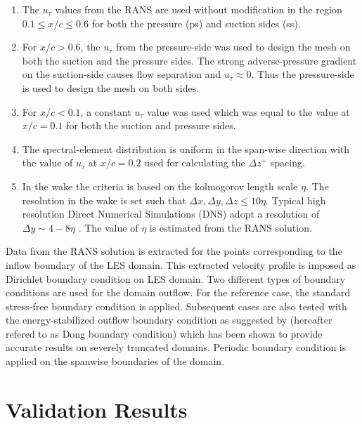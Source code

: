 \begin{enumerate}[topsep=5pt]
	\item The $u_{\tau}$ values from the RANS are used without modification in the region $0.1\le x/c\le0.6$ for both the pressure (ps) and suction sides (ss).
	\item For $x/c>0.6$, the $u_{\tau}$ from the pressure-side was used to design the mesh on both the suction and the pressure sides. The strong adverse-pressure gradient on the suction-side causes flow separation and $u_{\tau}\approx0$. Thus the pressure-side is used to design the mesh on both sides.
	\item For $x/c<0.1$, a constant $u_{\tau}$ value was used which was equal to the value at $x/c=0.1$ for both the suction and pressure sides.
	\item The spectral-element distribution is uniform in the span-wise direction with the value of $u_{\tau}$ at $x/c=0.2$ used for calculating the $\Delta z^{+}$ spacing.
	\item In the wake the criteria is based on the kolmogorov length scale $\eta$. The resolution in the wake is set such that $\Delta x,\Delta y,\Delta z\le10\eta$. Typical high resolution Direct Numerical Simulations (DNS) adopt a resolution of $\Delta y \sim 4-8\eta$ \citep{schlatter10,sillero13,hosseini16}. The value of $\eta$ is estimated from the RANS solution. 
\end{enumerate}
Data from the RANS solution is extracted for the points corresponding to the inflow boundary of the LES domain. This extracted velocity profile is imposed as Dirichlet boundary condition on LES domain. Two different types of boundary conditions are used for the domain outflow. For the reference case, the standard stress-free boundary condition is applied. Subsequent cases are also tested with the energy-stabilized outflow boundary condition as suggested by \cite{dong2014} (hereafter refered to as Dong boundary condition) which has been shown to provide accurate results on severely truncated domains\citep{dong2014}. Periodic boundary condition is applied on the spanwise boundaries of the domain. 

\section{Validation Results}

